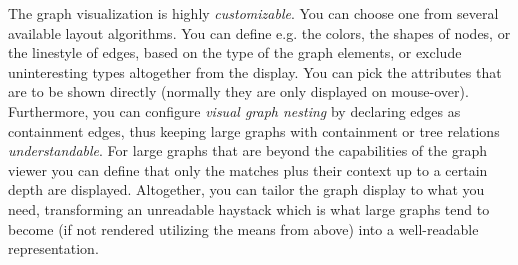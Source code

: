 The graph visualization is highly \emph{customizable}.
You can choose one from several available layout algorithms.
You can define e.g. the colors, the shapes of nodes, or the linestyle of edges, based on the type of the graph elements,
or exclude uninteresting types altogether from the display.
You can pick the attributes that are to be shown directly (normally they are only displayed on mouse-over).
Furthermore, you can configure \emph{visual graph nesting} by declaring edges as containment edges, thus keeping large graphs with containment or tree relations \emph{understandable}.
For large graphs that are beyond the capabilities of the graph viewer you can define that only the matches plus their context up to a certain depth are displayed.
Altogether, you can tailor the graph display to what you need, transforming an unreadable haystack which is what large graphs tend to become (if not rendered utilizing the means from above) into a well-readable representation.

